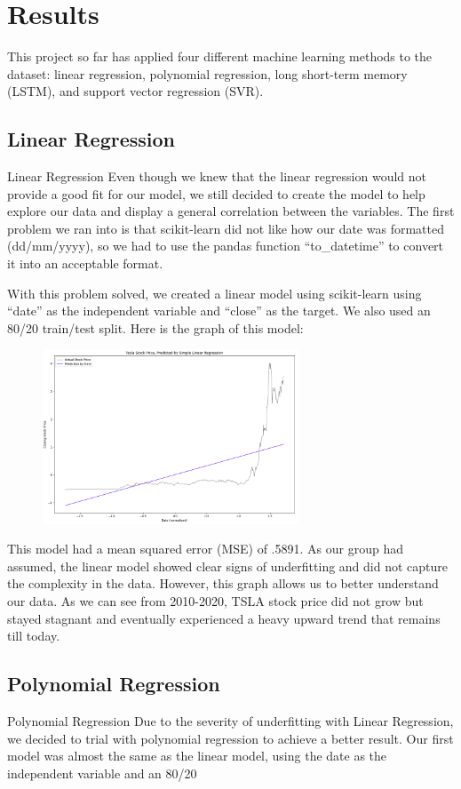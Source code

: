 \documentclass[12pt,a4paper]{article}
\begin{document}
\section{Results}
This project so far has applied four different machine learning methods to the dataset: linear regression, polynomial regression, long short-term memory (LSTM), and support vector regression (SVR).

\subsection{Linear Regression}
Linear Regression
Even though we knew that the linear regression would not provide a good fit for our model, we still decided to create the model to help explore our data and display a general correlation between the variables. The first problem we ran into is that scikit-learn did not like how our date was formatted (dd/mm/yyyy), so we had to use the pandas function “to_datetime” to convert it into an acceptable format. 

With this problem solved, we created a linear model using scikit-learn using “date” as the independent variable and “close” as the target. We also used an 80/20 train/test split. Here is the graph of this model:

\begin{figure}[h]
\centering
\includegraphics[width=3in]{./Figures/LinearRegression.png}
\end{figure}

This model had a mean squared error (MSE) of .5891. As our group had assumed, the linear model showed clear signs of underfitting and did not capture the complexity in the data. However, this graph allows us to better understand our data. As we can see from 2010-2020, TSLA stock price did not grow but stayed stagnant and eventually experienced a heavy upward trend that remains till today. 


\subsection{Polynomial Regression}
Polynomial Regression
Due to the severity of underfitting with Linear Regression, we decided to trial with polynomial regression to achieve a better result. Our first model was almost the same as the linear model, using the date as the independent variable and an 80/20%
\end{document}
